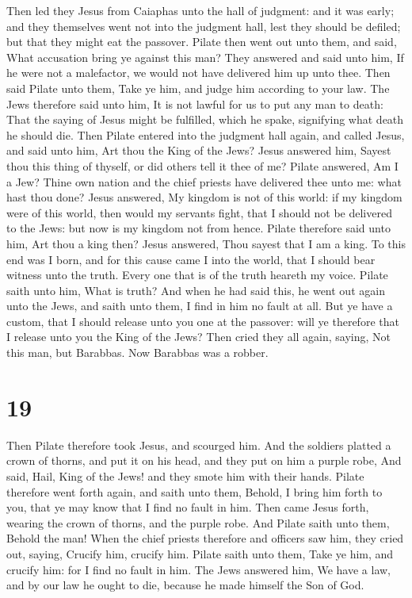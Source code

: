  Then led they Jesus from Caiaphas unto the hall of
judgment: and it was early; and they themselves went not into the
judgment hall, lest they should be defiled; but that they might eat the
passover.  Pilate then went out unto them, and said, What
accusation bring ye against this man?  They answered and
said unto him, If he were not a malefactor, we would not have delivered
him up unto thee.  Then said Pilate unto them, Take ye
him, and judge him according to your law. The Jews therefore said unto
him, It is not lawful for us to put any man to death: 
That the saying of Jesus might be fulfilled, which he spake, signifying
what death he should die.  Then Pilate entered into the
judgment hall again, and called Jesus, and said unto him, Art thou the
King of the Jews?  Jesus answered him, Sayest thou this
thing of thyself, or did others tell it thee of me? 
Pilate answered, Am I a Jew? Thine own nation and the chief priests have
delivered thee unto me: what hast thou done?  Jesus
answered, My kingdom is not of this world: if my kingdom were of this
world, then would my servants fight, that I should not be delivered to
the Jews: but now is my kingdom not from hence.  Pilate
therefore said unto him, Art thou a king then? Jesus answered, Thou
sayest that I am a king. To this end was I born, and for this cause came
I into the world, that I should bear witness unto the truth. Every one
that is of the truth heareth my voice.  Pilate saith unto
him, What is truth? And when he had said this, he went out again unto
the Jews, and saith unto them, I find in him no fault at all.
 But ye have a custom, that I should release unto you one
at the passover: will ye therefore that I release unto you the King of
the Jews?  Then cried they all again, saying, Not this
man, but Barabbas. Now Barabbas was a robber.

\hypertarget{section-18}{%
\section{19}\label{section-18}}

 Then Pilate therefore took Jesus, and scourged him.
 And the soldiers platted a crown of thorns, and put it on
his head, and they put on him a purple robe,  And said,
Hail, King of the Jews! and they smote him with their hands.
 Pilate therefore went forth again, and saith unto them,
Behold, I bring him forth to you, that ye may know that I find no fault
in him.  Then came Jesus forth, wearing the crown of
thorns, and the purple robe. And Pilate saith unto them, Behold the man!
 When the chief priests therefore and officers saw him,
they cried out, saying, Crucify him, crucify him. Pilate saith unto
them, Take ye him, and crucify him: for I find no fault in him.
 The Jews answered him, We have a law, and by our law he
ought to die, because he made himself the Son of God.

